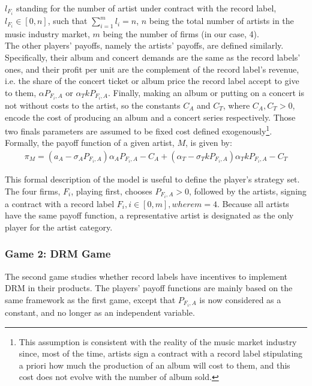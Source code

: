 \documentclass[a4paper,12pt]{article}
\numberwithin{equation}{section}
\begin{document}
$l_{F_i}$ standing for the number of artist under contract with the record label, $l_{F_i} \in [0, n]$, such that $\sum_{i = 1}^m l_i = n$, $n$ being the total number of artists in the music industry market, $m$ being the number of firms (in our case, 4).\\

The other players’ payoffs, namely the artists’ payoffs, are defined similarly. Specifically, their album and concert demands are the same as the record labels’ ones, and their profit per unit are the complement of the record label’s revenue, i.e. the share of the concert ticket or album price the record label accept to give to them, $\alpha P_{F_i, A}$ or $\alpha_T k P_{F_i, A}$. Finally, making an album or putting on a concert is not without costs to the artist, so the constants $C_A$ and $C_T$, where $C_A, C_T > 0$,  encode the cost of producing an album and a concert series respectively. Those two finals parameters are assumed to be fixed cost defined exogenously\footnote{
This assumption is consistent with the reality of the music market industry since, most of the time, artists sign a contract with a record label stipulating a priori how much the production of an album will cost to them, and this cost does not evolve with the number of album sold.
}. Formally, the payoff function of a given artist, $M$, is given by:
\begin{eqnarray}
\pi_M = (a_A - \sigma_A P_{F_i, A})\alpha_A P_{F_i, A} - C_A
	+ (\alpha_T - \sigma_T k P_{F_i, A}) \alpha_T k P_{F_i, A} - C_T
\end{eqnarray}

This formal description of the model is useful to define the player’s strategy set. The four firms, $F_i$, playing first, chooses $P_{F_i, A} > 0$, followed by the artists, signing a contract with a record label $F_i, i \in [0, m], where m = 4$. Because all artists have the same payoff function, a representative artist is designated as the only player for the artist category. 

\subsubsection{Game 2: DRM Game}

The second game studies whether record labels have incentives to implement DRM in their products. The players’ payoff functions are mainly based on the same framework as the first game, except that $P_{F_i, A}$ is now considered as a constant, and no longer as an independent variable.\\
\end{document}
